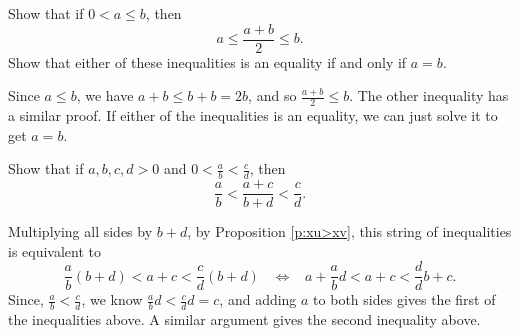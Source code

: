 \documentclass[11pt,dvipsnames]{book}
\numberwithin{equation}{section} %
\numberwithin{figure}{section} %
\numberwithin{table}{section} %
\begin{document}
\begin{exercise} Show that if $0<a\leq b$, then
\[
a\leq \frac{a+b}{2}\leq b.
\]
Show that either of these inequalities is an equality if and only if $a=b$.

\begin{solution}
Since $a\leq b$, we have $a+b\leq b+b=2b$, and so $\frac{a+b}{2} \leq b$. The other inequality has a similar proof. If either of the inequalities is an equality, we can just solve it to get $a=b$. 
\end{solution}
\end{exercise}


\begin{exercise} Show that if $a,b,c,d>0$ and $0<\frac{a}{b}<\frac{c}{d}$, then 
\[
\frac{a}{b} < \frac{a+c}{b+d}<\frac{c}{d}.
\]
\begin{solution}
Multiplying all sides by $b+d$, by Proposition \ref{p:xu>xv}, this string of inequalities is equivalent to 
\[
\frac{a}{b}(b+d) < a+c <\frac{c}{d}(b+d) 
\;\; \; \Longleftrightarrow \;\;\; 
a+\frac{a}{b}d< a+c <\frac{d}{d}b+c.
\]
Since, $\frac{a}{b}<\frac{c}{d}$, we know $\frac{a}{b}d <\frac{c}{d}d=c$, and adding $a$ to both sides gives the first of the inequalities above. A similar argument gives the second inequality above.
\end{solution}

\end{exercise}
\end{document}
